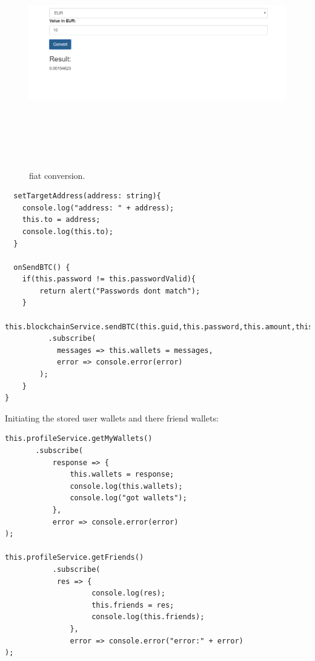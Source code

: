 \begin{figure}[H]
\centering
\includegraphics[width=16cm, height=10cm]{img/fiat.png}
\caption{fiat conversion.}
\end{figure}

\begin{lstlisting}
  setTargetAddress(address: string){
    console.log("address: " + address);
    this.to = address;
    console.log(this.to);
  }

  onSendBTC() {
    if(this.password != this.passwordValid){
        return alert("Passwords dont match");
    }
    this.blockchainService.sendBTC(this.guid,this.password,this.amount,this.to)
          .subscribe(
            messages => this.wallets = messages,
            error => console.error(error)
        );
    }
}
\end{lstlisting}

Initiating the stored user wallets and there friend wallets:
\begin{lstlisting}
this.profileService.getMyWallets()
       .subscribe(
           response => {
               this.wallets = response;
               console.log(this.wallets);
               console.log("got wallets");
           },
           error => console.error(error)
);

this.profileService.getFriends()
           .subscribe(
            res => {
                    console.log(res);
                    this.friends = res;
                    console.log(this.friends);
               },
               error => console.error("error:" + error)
);
\end{lstlisting}

